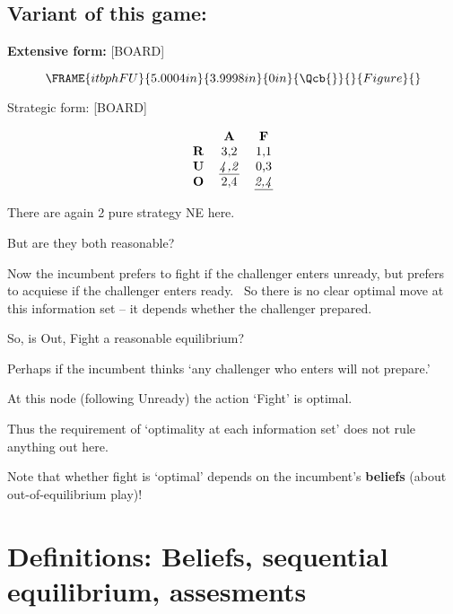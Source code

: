 \documentclass{article}
\begin{document}
\subsection{Variant of this game:}

\textbf{Extensive form: }[BOARD]

\[
\FRAME{itbphFU}{5.0004in}{3.9998in}{0in}{\Qcb{}}{}{Figure}{\special{language
"Scientific Word";type "GRAPHIC";maintain-aspect-ratio TRUE;display
"USEDEF";valid_file "T";width 5.0004in;height 3.9998in;depth
0in;original-width 5.4803in;original-height 3.4396in;cropleft "0";croptop
"1";cropright "1";cropbottom "0";tempfilename
'JSH9C61X.wmf';tempfile-properties "XPR";}}
\]

Strategic form: [BOARD]

\[
\begin{tabular}{ccc}
& \textbf{A} & \textbf{F} \\ 
\textbf{R} & 3,2 & 1,1 \\ 
\textbf{U} & \underline{\textit{4}}\underline{\textit{,2}} & 0,3 \\ 
\textbf{O} & 2,4 & \underline{\textit{2,4}}%
\end{tabular}%
\]

There are again 2 pure strategy NE here. \ 

But are they both reasonable?

\bigskip

Now the incumbent prefers to fight if the challenger enters unready, but
prefers to acquiese if the challenger enters ready. \ So there is no clear
optimal move at this information set -- it depends whether the challenger
prepared.

\bigskip 

So, is Out, Fight a reasonable equilibrium?

Perhaps if the incumbent thinks `any challenger who enters will not prepare.'

At this node (following Unready) the action `Fight' is optimal.

Thus the requirement of `optimality at each information set' does not rule
anything out here.

\bigskip

Note that whether fight is `optimal' depends on the incumbent's \textbf{%
beliefs }(about out-of-equilibrium play)!

\bigskip 

\section{Definitions: Beliefs, sequential equilibrium, assesments}
\end{document}
